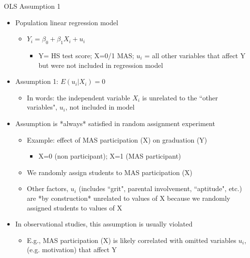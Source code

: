 \begin{frame}[shrink=10]{OLS Assumption 1}
	\begin{itemize}
	\item Population linear regression model
		\begin{itemize}
		\item $Y_{i} = \beta_{0} + \beta_{1}X_{i} + u_{i}$
			\begin{itemize}
			\item Y= HS test score; X=0/1 MAS; $u_{i}$ = all other variables that affect Y but were not included in regression model
			\end{itemize}
		\end{itemize}
	\item Assumption 1: $E(u_{i}|X_{i}) = 0$
		\begin{itemize}
		\item In words: the independent variable $X_{i}$ is unrelated to the ``other variables", $u_{i}$, not included in model
		\end{itemize}
	\item Assumption is *always* satisfied in random assignment experiment
		\begin{itemize}
		\item Example: effect of MAS participation (X) on graduation (Y)
			\begin{itemize}
			\item X=0 (non participant); X=1 (MAS participant) 
			\end{itemize}	
		\item We randomly assign students to MAS participation (X)
		\item Other factors, $u_{i}$ (includes ``grit", parental involvement, ``aptitude", etc.) are *by construction* unrelated to values of X because we randomly assigned students to values of X
		\end{itemize}
	\item In observational studies, this assumption is usually violated
		\begin{itemize}
		\item E.g., MAS participation (X) is likely correlated with omitted variables $u_{i}$, (e.g. motivation) that affect Y
		\end{itemize}	
	\end{itemize}
\end{frame}




